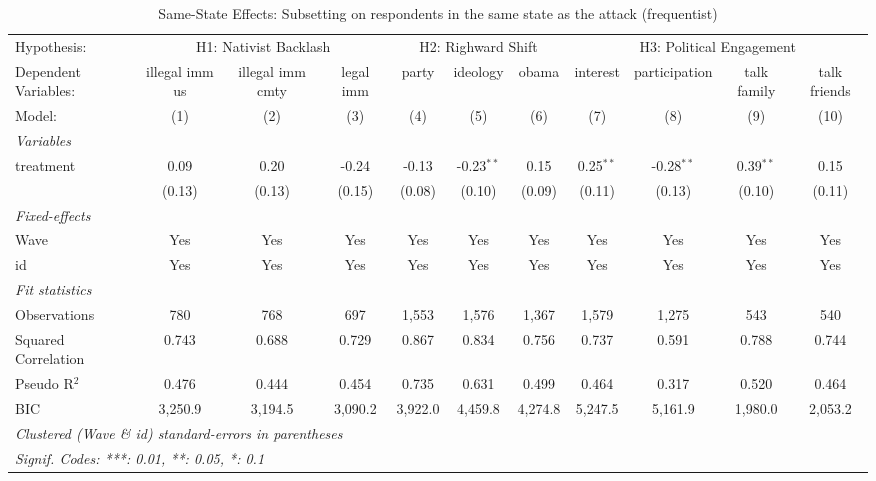 
\begin{table}[htbp]
   \caption{\label{tab:same_state} Same-State Effects: Subsetting on respondents in the same state as the attack (frequentist)}
   \centering
   \begin{tabular}{lcccccccccc}
      \tabularnewline \midrule \midrule
      Hypothesis: & \multicolumn{3}{c}{H1: Nativist Backlash} & \multicolumn{3}{c}{H2: Righward Shift} & \multicolumn{4}{c}{H3: Political Engagement} \\ 
      Dependent Variables: & illegal imm us & illegal imm cmty & legal imm & party   & ideology     & obama   & interest    & participation & talk family & talk friends\\  
      Model:               & (1)            & (2)              & (3)       & (4)     & (5)          & (6)     & (7)         & (8)           & (9)         & (10)\\  
      \midrule
      \emph{Variables}\\
      treatment            & 0.09           & 0.20             & -0.24     & -0.13   & -0.23$^{**}$ & 0.15    & 0.25$^{**}$ & -0.28$^{**}$  & 0.39$^{**}$ & 0.15\\   
                           & (0.13)         & (0.13)           & (0.15)    & (0.08)  & (0.10)       & (0.09)  & (0.11)      & (0.13)        & (0.10)      & (0.11)\\   
      \midrule
      \emph{Fixed-effects}\\
      Wave                 & Yes            & Yes              & Yes       & Yes     & Yes          & Yes     & Yes         & Yes           & Yes         & Yes\\  
      id                   & Yes            & Yes              & Yes       & Yes     & Yes          & Yes     & Yes         & Yes           & Yes         & Yes\\  
      \midrule
      \emph{Fit statistics}\\
      Observations         & 780            & 768              & 697       & 1,553   & 1,576        & 1,367   & 1,579       & 1,275         & 543         & 540\\  
      Squared Correlation  & 0.743          & 0.688            & 0.729     & 0.867   & 0.834        & 0.756   & 0.737       & 0.591         & 0.788       & 0.744\\  
      Pseudo R$^2$         & 0.476          & 0.444            & 0.454     & 0.735   & 0.631        & 0.499   & 0.464       & 0.317         & 0.520       & 0.464\\  
      BIC                  & 3,250.9        & 3,194.5          & 3,090.2   & 3,922.0 & 4,459.8      & 4,274.8 & 5,247.5     & 5,161.9       & 1,980.0     & 2,053.2\\  
      \midrule \midrule
      \multicolumn{11}{l}{\emph{Clustered (Wave \& id) standard-errors in parentheses}}\\
      \multicolumn{11}{l}{\emph{Signif. Codes: ***: 0.01, **: 0.05, *: 0.1}}\\
   \end{tabular}
\end{table}


